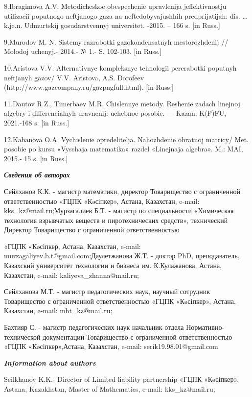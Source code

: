 8.Ibragimova A.V. Metodicheskoe obespechenie upravlenija
jeffektivnost\textquotesingle ju utilizacii poputnogo neftjanogo gaza na
neftedobyvajushhih predprijatijah: dis. \ldots{} k.je.n. Udmurtskij
gosudarstvennyj universitet. -2015. -- 166 s. {[}in Russ.{]}

9.Murodov M. N. Sistemy razrabotki gazokondensatnyh mestorozhdenij //
Molodoj uchenyj.- 2014.- № 1.- S. 102-103. {[}in Russ.{]}

10.Aristova V.V. Al\textquotesingle ternativnye kompleksnye tehnologii
pererabotki poputnyh neftjanyh gazov/ V.V. Aristova, A.S. Dorofeev
(http://www.gazcompany.ru/gazpngfull.html). {[}in Russ.{]}

11.Dautov R.Z., Timerbaev M.R. Chislennye metody. Reshenie zadach
linejnoj algebry i differencial\textquotesingle nyh uravnenij: uchebnoe
posobie. --- Kazan\textquotesingle: K(P)FU, 2021.-168 s. {[}in Russ.{]}

12.Kabanova O.A. Vychislenie opredelitelja. Nahozhdenie obratnoj
matricy/ Met. posobie po kursu «Vysshaja matematika» razdel «Linejnaja
algebra». M.: MAI, 2015.- 15 s. {[}in Russ.{]}

\emph{{\bfseries Сведения об авторах}}

Сейлханов К.К. - магистр математики, директор Товарищество с
ограниченной ответственностью «ГЦПК «Кəсіпкер», Астана, Казахстан,
e-mail: kks\_kz@mail.ru;Мурзагалиев Б.Т. - магистр по специальности
«Химическая технология взрывчатых веществ и пиротехнических средств»,
технический Директор Товарищество с ограниченной ответственностью

«ГЦПК «Кəсіпкер, Астана, Казахстан, e-mail:
murzagaliyev.b.t@gmail.com;Даулетжанова Ж.Т. - доктор PhD,
преподаватель, Казахский университет технологии и бизнеса им.
К.Кулажанова, Астана, Казахстан, e-mail: kaliyeva\_zhanna@mail.ru;

Сейлханова М.Т. - магистр педагогических наук, научный сотрудник
Товарищество с ограниченной ответственностью «ГЦПК «Кəсіпкер», Астана,
Казахстан, e-mail: mbt\_kz@mail.ru;

Бахтияр С. - магистр педагогических наук начальник отдела
Нормативно-технической документации Товарищество с ограниченной
ответственностью «ГЦПК «Кəсіпкер»,Астана, Казахстан, e-mail:
serik19.98.01@gmail.com

\emph{{\bfseries Information about authors}}

Seilkhanov K.K.- Director of Limited liability partnership «ГЦПК
«Кəсіпкер», Astana, Kazakhstan, Master of Mathematics, e-mail:
kks\_kz@mail.ru;

